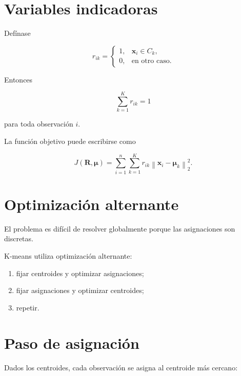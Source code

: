 \documentclass[
  spanish,
  10.5pt,
  letterpaper,
  DIV=11,
  numbers=noendperiod,
  oneside,
  open=any]{scrreprt}
\providecommand{\tightlist}{%
  \setlength{\itemsep}{0pt}\setlength{\parskip}{0pt}}
\theoremstyle{definition}
\theoremstyle{definition}
\theoremstyle{plain}
\theoremstyle{remark}
\begin{document}
\section*{Variables indicadoras}\label{variables-indicadoras-1}


Defínase

\[
r_{ik}
=
\begin{cases}
1, & \mathbf{x}_i\in C_k,\\
0, & \text{en otro caso}.
\end{cases}
\]

Entonces

\[
\sum_{k=1}^{K}r_{ik}=1
\]

para toda observación \(i\).

La función objetivo puede escribirse como

\[
J(\mathbf{R},\boldsymbol{\mu})
=
\sum_{i=1}^{n}
\sum_{k=1}^{K}
r_{ik}
\left\|
\mathbf{x}_i-\boldsymbol{\mu}_k
\right\|_2^2.
\]

\section*{Optimización alternante}\label{optimizaciuxf3n-alternante}


El problema es difícil de resolver globalmente porque las asignaciones
son discretas.

K-means utiliza optimización alternante:

\begin{enumerate}
\def\labelenumi{\arabic{enumi}.}
\tightlist
\item
  fijar centroides y optimizar asignaciones;
\item
  fijar asignaciones y optimizar centroides;
\item
  repetir.
\end{enumerate}

\section*{Paso de asignación}\label{paso-de-asignaciuxf3n}


Dados los centroides, cada observación se asigna al centroide más
cercano:
\end{document}
